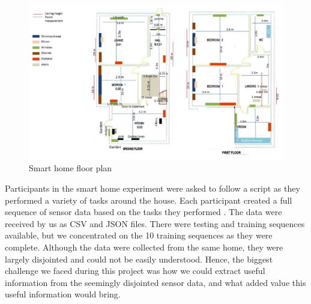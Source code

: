 \documentclass[fleqn,10pt]{SelfArx} %
\begin{document}
\begin{figure}[!h] \centering
	\includegraphics[scale=0.6]{floorplan} 
	\caption{Smart home floor plan \cite{sphere2016}}
	\label{fig:floorplan}
\end{figure}

Participants in the smart home experiment were asked to follow a script as they performed a variety of tasks around the house. Each participant created a full sequence of sensor data based on the tasks they performed \cite{sphere2016}. The data were received by us as CSV and JSON files. There were testing and training sequences available, but we concentrated on the 10 training sequences as they were complete. Although the data were collected from the same home, they were largely disjointed and could not be easily understood. Hence, the biggest challenge we faced during this project was how we could extract useful information from the seemingly disjointed sensor data, and what added value this useful information would bring.  \\
\end{document}
